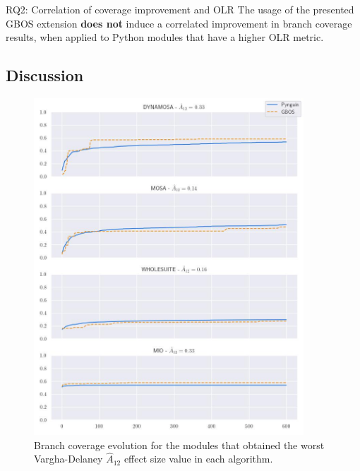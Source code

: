 \documentclass[%
  chapterprefix=false,%
  open=right,%
  twoside=true,%
  paper=a4,%
  logofile={Figures/logo.png},%
  thesistype=master,%
  UKenglish,%
]{se2thesis}
\begin{document}
\begin{summary}{RQ2: Correlation of coverage improvement and OLR}
  The usage of the presented GBOS extension \textbf{does not} induce a correlated improvement in branch coverage results, when applied to Python modules that have a higher OLR metric.
\end{summary}

\subsection*{Discussion}

\begin{figure}[ptbh]
  \centering
  \includegraphics[width=0.9\textwidth]{Figures/Results/worstA12.jpg}
  \caption{Branch coverage evolution for the modules that obtained the worst Vargha-Delaney \(\hat{A}_{12}\) effect size value in each algorithm.}\label{fig:worsta12}
\end{figure}
\end{document}
